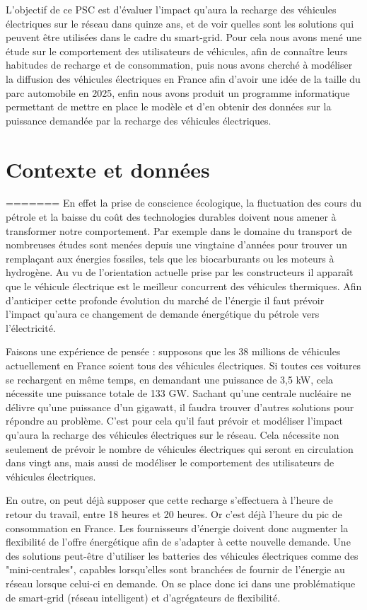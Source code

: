 \documentclass[10pt]{article}
\begin{document}
L'objectif de ce PSC est d'évaluer l'impact qu'aura la recharge des véhicules électriques sur le réseau dans quinze ans, et de voir quelles sont les solutions qui peuvent être utilisées dans le cadre du smart-grid. Pour cela nous avons mené une étude sur le comportement des utilisateurs de véhicules, afin de connaître leurs habitudes de recharge et de consommation, puis nous avons cherché à modéliser la diffusion des véhicules électriques en France afin d'avoir une idée de la taille du parc automobile en 2025, enfin nous avons produit un programme informatique permettant de mettre en place le modèle et d'en obtenir des données sur la puissance demandée par la recharge des véhicules électriques.

\section{Contexte et donn\'ees}
=======
En effet la prise de conscience écologique, la fluctuation des cours du pétrole et la baisse du coût des technologies durables doivent nous amener à transformer notre comportement. 
Par exemple dans le domaine du transport de nombreuses études sont menées depuis une vingtaine d'années pour trouver un remplaçant aux énergies fossiles, tels que les biocarburants ou les moteurs à hydrogène.
Au vu de l'orientation actuelle prise par les constructeurs il apparaît que le véhicule électrique est le meilleur concurrent des véhicules thermiques. 
Afin d'anticiper cette profonde évolution du marché de l'énergie il faut prévoir l'impact qu'aura ce changement de demande énergétique du pétrole vers l'électricité. 

Faisons une expérience de pensée : supposons que les 38 millions de véhicules actuellement en France soient tous des véhicules électriques. Si toutes ces voitures se rechargent en même temps, en demandant une puissance de 3,5 kW, cela nécessite une puissance totale de 133 GW. Sachant qu'une centrale nucléaire ne délivre qu'une puissance d'un gigawatt, il faudra trouver d'autres solutions pour répondre au problème. C'est pour cela qu'il faut prévoir et modéliser l'impact qu'aura la recharge des véhicules électriques sur le réseau. Cela nécessite non seulement de prévoir le nombre de véhicules électriques qui seront en circulation dans vingt ans, mais aussi de modéliser le comportement des utilisateurs de véhicules électriques. 

En outre, on peut déjà supposer que cette recharge s'effectuera à l'heure de retour du travail, entre 18 heures et 20 heures. Or c'est déjà l'heure du pic de consommation en France. Les fournisseurs d'énergie doivent donc augmenter la flexibilité de l'offre énergétique afin de s'adapter à cette nouvelle demande. Une des solutions peut-être d'utiliser les batteries des véhicules électriques comme des "mini-centrales", capables lorsqu'elles sont branchées de fournir de l'énergie au réseau lorsque celui-ci en demande. On se place donc ici dans une problématique de smart-grid (réseau intelligent) et d'agrégateurs de flexibilité. 
\end{document}
